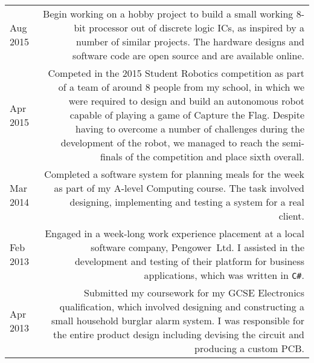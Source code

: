 
\vspace{-1.2em}

\begin{longtable}{L!{\sep}R}
    Aug 2015 &
    Begin working on a hobby project to build a small working 8-bit processor out of discrete logic ICs, as inspired by a number of similar projects. The hardware designs and software code are open source and are available online.
    \vspace{1.2em} \\

    Apr 2015 &
    Competed in the 2015 Student Robotics competition as part of a team of around 8 people from my school, in which we were required to design and build an autonomous robot capable of playing a game of Capture the Flag. Despite having to overcome a number of challenges during the development of the robot, we managed to reach the semi-finals of the competition and place sixth overall.
    \vspace{1.2em} \\

    Mar 2014 &
    Completed a software system for planning meals for the week as part of my A-level Computing course. The task involved designing, implementing and testing a system for a real client.
    \vspace{1.2em} \\


    Feb 2013 &
    Engaged in a week-long work experience placement at a local software company, \mbox{Pengower Ltd}. I assisted in the development and testing of their platform for business applications, which was written in \texttt{C\#}.
    \vspace{1.2em} \\

    Apr 2013 &
    Submitted my coursework for my GCSE Electronics qualification, which involved designing and constructing a small household burglar alarm system. I was responsible for the entire product design including devising the circuit and producing a custom PCB.
    \vspace{1.2em} \\


\end{longtable}
